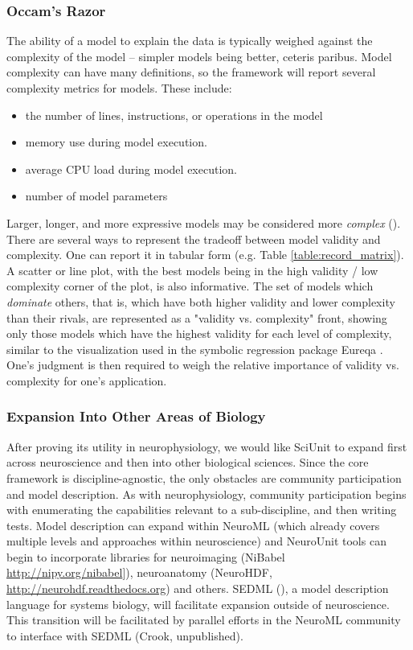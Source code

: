 \documentclass[11pt,letterpaper]{article}
\begin{document}
\subsubsection{Occam's Razor}
The ability of a model to explain the data is typically weighed against the complexity of the model -- simpler models being better, ceteris paribus.  Model complexity can have many definitions, so the framework will report several complexity metrics for models.  These include:
\begin{itemize}
\item the number of lines, instructions, or operations in the model
\item memory use during model execution.  
\item average CPU load during model execution.  
\item number of model parameters
\end{itemize}
Larger, longer, and more expressive models may be considered more \textit{complex} (\cite{mccabe_complexity_1976}).  There are several ways to represent the tradeoff between model validity and complexity.  One can report it in tabular form (e.g. Table \ref{table:record_matrix}).  A scatter or line plot, with the best models being in the high validity / low complexity corner of the plot, is also informative.  The set of models which \textit{dominate} others, that is, which have both higher validity and lower complexity than their rivals, are represented as a "validity vs. complexity" front, showing only those models which have the highest validity for each level of complexity, similar to the visualization used in the symbolic regression package Eureqa \cite{schmidt_distilling_2009}.  One's judgment is then required to weigh the relative importance of validity vs. complexity for one's application.  

\subsubsection{Expansion Into Other Areas of Biology}
After proving its utility in neurophysiology, we would like SciUnit to expand first across neuroscience and then into other biological sciences.  Since the core framework is discipline-agnostic, the only obstacles are community participation and model description.  As with neurophysiology, community participation begins with enumerating the capabilities relevant to a sub-discipline, and then writing tests.  Model description can expand within NeuroML (which already covers multiple levels and approaches within neuroscience) and NeuroUnit tools can begin to incorporate libraries for neuroimaging (NiBabel \url{http://nipy.org/nibabel}]), neuroanatomy (NeuroHDF, \url{http://neurohdf.readthedocs.org}) and others.  SEDML (\cite{hucka_systems_2003}), a model description language for systems biology, will facilitate expansion outside of neuroscience.  This transition will be facilitated by parallel efforts in the NeuroML community to interface with SEDML (Crook, unpublished).    
\end{document}
